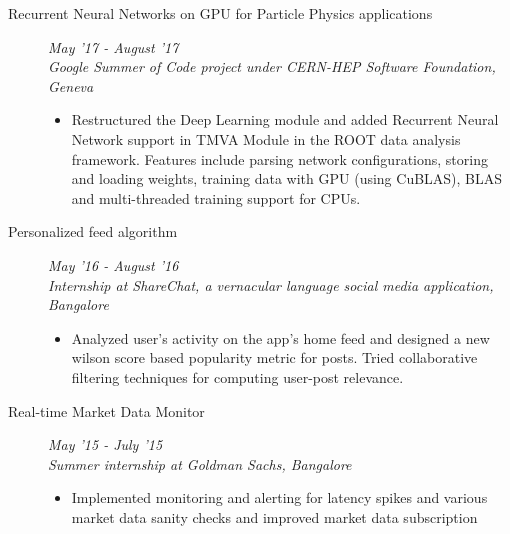 \documentclass[9pt]{article}
\newenvironment{changemargin}[2]{%
  \begin{list}{}{%
      \setlength{\topsep}{0pt}%
    \setlength{\leftmargin}{#1}%
    \setlength{\rightmargin}{#2}%
    \setlength{\listparindent}{\parindent}%
  \setlength{\itemindent}{\parindent}%
    \setlength{\parsep}{\parskip}%
    }%
  \item[]}{\end{list}
    }
\newenvironment{body} {
  \vspace*{-16pt}
        \begin{changemargin}{-0.6in}{-0.65in}
        }	
        {\end{changemargin}
}
\begin{document}
\begin{body}
\begin{description}
    \item[\normalsize{Recurrent Neural Networks on GPU for Particle Physics applications}] \hfill \textit{May '17 - August '17} \\
      \textit{Google Summer of Code project under CERN-HEP Software Foundation, Geneva}
      \begin{itemize}
        \item Restructured the Deep Learning module and added Recurrent Neural Network
          support in TMVA Module in the ROOT data analysis framework. Features include
          parsing network configurations, storing and loading weights, training data with GPU 
          (using CuBLAS), BLAS and multi-threaded training support for CPUs.
      \end{itemize}

    \item [\normalsize{Personalized feed algorithm}] \hfill \textit{May '16 - August '16} \\
      \textit{Internship at ShareChat, a vernacular language social media application, Bangalore} \\
      \begin{itemize}
        \item Analyzed user's activity on the app's home feed and designed a new
          wilson score based popularity metric for posts. Tried collaborative 
          filtering techniques for computing user-post relevance.
      \end{itemize}

    \item[\normalsize{Real-time Market Data Monitor}] \hfill \textit{May '15 - July '15} \\
      \textit{Summer internship at Goldman Sachs, Bangalore} 
      \begin{itemize}
        \item Implemented monitoring and alerting for latency spikes and various
          market data sanity checks and improved market data subscription
      \end{itemize}

  \end{description}

\end{body}
\end{document}
